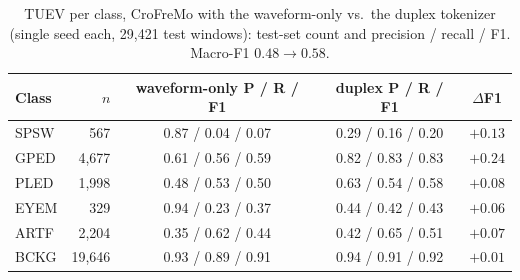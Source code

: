 \begin{table}[t]
\centering
\scriptsize
\caption{Duplex vs.\ waveform-only tokenizer in the same encoder, event classification. Single seeds.}
\label{tab:abl-events}
\end{table}

\begin{table}[t]
\centering
\scriptsize
\caption{TUEV per class, CroFreMo with the waveform-only vs.\ the duplex
tokenizer (single seed each, 29,421 test windows): test-set count and
precision / recall / F1. Macro-F1 $0.48 \to 0.58$.}
\label{tab:perclass}
\begin{tabular}{lrccc}
\toprule
Class & $n$ & waveform-only P / R / F1 & duplex P / R / F1 & $\Delta$F1 \\
\midrule
SPSW & 567 & 0.87 / 0.04 / 0.07 & 0.29 / 0.16 / 0.20 & $+0.13$ \\
GPED & 4,677 & 0.61 / 0.56 / 0.59 & 0.82 / 0.83 / 0.83 & $+0.24$ \\
PLED & 1,998 & 0.48 / 0.53 / 0.50 & 0.63 / 0.54 / 0.58 & $+0.08$ \\
EYEM & 329 & 0.94 / 0.23 / 0.37 & 0.44 / 0.42 / 0.43 & $+0.06$ \\
ARTF & 2,204 & 0.35 / 0.62 / 0.44 & 0.42 / 0.65 / 0.51 & $+0.07$ \\
BCKG & 19,646 & 0.93 / 0.89 / 0.91 & 0.94 / 0.91 / 0.92 & $+0.01$ \\
\bottomrule
\end{tabular}
\end{table}


